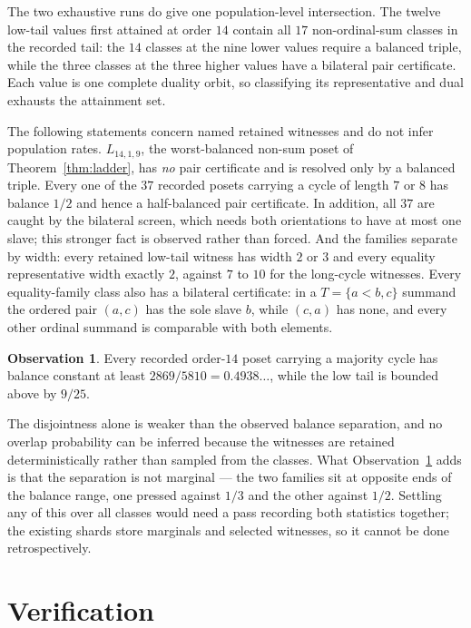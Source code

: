 \documentclass[11pt]{article}
\theoremstyle{definition}
\newtheorem{observation}[theorem]{Observation}
\newcommand{\MINCYCBAL}{2869/5810 = 0.4938\ldots}
\begin{document}
The two exhaustive runs do give one population-level intersection.  The
twelve low-tail values first attained at order $14$ contain all $17$
non-ordinal-sum classes in the recorded tail: the $14$ classes at the nine
lower values require a balanced triple, while the three classes at the three
higher values have a bilateral pair certificate.  Each value is one complete
duality orbit, so classifying its representative and dual exhausts the
attainment set.

The following statements concern named retained witnesses and do not infer
population rates.
$L_{14,1,9}$, the worst-balanced non-sum poset of Theorem~\ref{thm:ladder},
has \emph{no} pair certificate and is resolved only by a balanced triple.
Every one of the $37$ recorded posets carrying a cycle of length $7$ or $8$
has balance $1/2$ and hence a half-balanced pair certificate.  In addition,
all $37$ are caught by the bilateral screen, which needs both orientations to
have at most one slave; this stronger fact is observed rather than forced.
And the families separate by width:
every retained low-tail witness has width $2$ or $3$ and every equality
representative width exactly $2$, against $7$ to $10$ for the long-cycle
witnesses.  Every equality-family class also has a bilateral certificate:
in a $T=\{a<b,c\}$ summand the ordered pair $(a,c)$ has the sole slave $b$,
while $(c,a)$ has none, and every other ordinal summand is comparable with
both elements.

\begin{observation}\label{obs:meet}
Every recorded order-$14$ poset carrying a majority cycle has balance constant
at least $\MINCYCBAL$, while the low tail is bounded above by $9/25$.
\end{observation}

The disjointness alone is weaker than the observed balance separation, and no
overlap probability can be inferred because the witnesses are retained
deterministically rather than sampled from the classes.  What
Observation~\ref{obs:meet} adds is that the separation is not marginal --- the
two families sit at opposite ends of the balance range, one pressed against
$1/3$ and the other against $1/2$.
Settling any of this over all classes would need a pass recording both
statistics together; the existing shards store marginals and selected
witnesses, so it cannot be done retrospectively.

\section{Verification}\label{sec:verify}
\end{document}
